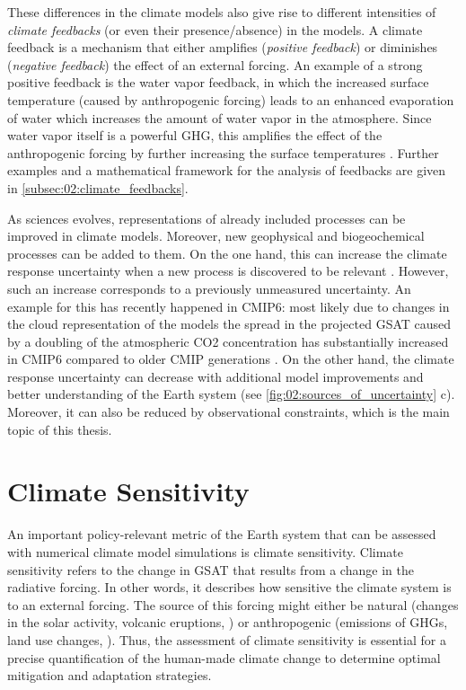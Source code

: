 These differences in the climate models also give rise to different intensities
of \emph{climate feedbacks} (or even their presence/absence) in the models. A
climate feedback is a mechanism that either amplifies (\emph{positive
  feedback}) or diminishes (\emph{negative feedback}) the effect of an external
forcing. An example of a strong positive feedback is the water vapor feedback,
in which the increased surface temperature (caused by anthropogenic forcing)
leads to an enhanced evaporation of water which increases the amount of water
vapor in the atmosphere. Since water vapor itself is a powerful \ac{GHG}, this
amplifies the effect of the anthropogenic forcing by further increasing the
surface temperatures \autocite{Cubasch2013}. Further examples and a
mathematical framework for the analysis of feedbacks are given in
\cref{subsec:02:climate_feedbacks}.

As sciences evolves, representations of already included processes can be
improved in climate models. Moreover, new geophysical and biogeochemical
processes can be added to them. On the one hand, this can increase the climate
response uncertainty when a new process is discovered to be relevant
. However, such an
increase corresponds to a previously unmeasured uncertainty. An example for
this has recently happened in \acs{CMIP}6: most likely due to changes in the
cloud representation of the models the spread in the projected \ac{GSAT} caused
by a doubling of the atmospheric \ac{CO2} concentration has substantially
increased in \acs{CMIP}6 compared to older \ac{CMIP} generations
\autocite{Zelinka2020}. On the other hand, the climate response uncertainty can
decrease with additional model improvements and better understanding of the
Earth system (see \cref{fig:02:sources_of_uncertainty}{\color{BrownRed} c}).
Moreover, it can also be reduced by observational constraints, which is the
main topic of this thesis.


\section{Climate Sensitivity}
\label{sec:02:climate_sensitivity}

An important policy-relevant metric of the Earth system that can be assessed
with numerical climate model simulations is climate sensitivity. Climate
sensitivity refers to the change in \ac{GSAT} that results from a change in the
radiative forcing. In other words, it describes how sensitive the climate
system is to an external forcing. The source of this forcing might either be
natural (changes in the solar activity, volcanic eruptions, \etc{}) or
anthropogenic (emissions of \acp{GHG}, land use changes, \etc{}). Thus, the
assessment of climate sensitivity is essential for a precise quantification of
the human-made climate change to determine optimal mitigation and adaptation
strategies.


